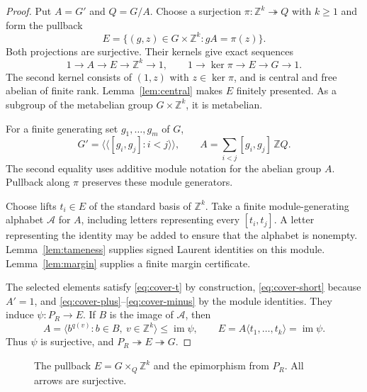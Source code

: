 \documentclass[12pt]{article}
\makeatletter
\renewcommand{\small}{\@setfontsize\small{11}{13.5}}
\numberwithin{equation}{section}
\theoremstyle{definition}
\theoremstyle{remark}
\newcommand{\Z}{\mathbb Z}
\newcommand{\nc}[1]{\langle\!\langle #1\rangle\!\rangle}
\newcommand{\im}{\operatorname{im}}
\newcommand{\epito}{\twoheadrightarrow}
\makeatother
\begin{document}
\begin{proof}
Put $A=G'$ and $Q=G/A$. Choose a surjection
$\pi:\Z^k\epito Q$ with $k\ge1$ and form the pullback
\[
 E=\{(g,z)\in G\times\Z^k:gA=\pi(z)\}.
\]
Both projections are surjective. Their kernels give exact sequences
\begin{equation}
\label{eq:pullback-sequences}
 1\longrightarrow A\longrightarrow E\longrightarrow\Z^k\longrightarrow1,
 \qquad
 1\longrightarrow\ker\pi\longrightarrow E\longrightarrow G\longrightarrow1.
\end{equation}
The second kernel consists of $(1,z)$ with $z\in\ker\pi$, and is
central and free abelian of finite rank. Lemma~\ref{lem:central}
makes $E$ finitely presented. As a subgroup of the metabelian group
$G\times\Z^k$, it is metabelian.

For a finite generating set $g_1,\ldots,g_m$ of $G$,
\[
 G'=\nc{[g_i,g_j]:i<j},\qquad
 A=\sum_{i<j}[g_i,g_j]\,\Z Q.
\]
The second equality uses additive module notation for the abelian
group $A$. Pullback along $\pi$ preserves these module generators.

Choose lifts $t_i\in E$ of the standard basis of $\Z^k$. Take a finite
module-generating alphabet $\mathcal A$ for $A$, including letters
representing every $[t_i,t_j]$. A letter representing the identity
may be added to ensure that the alphabet is nonempty.
Lemma~\ref{lem:tameness} supplies signed Laurent identities on this
module. Lemma~\ref{lem:margin} supplies a finite margin certificate.

The selected elements satisfy \eqref{eq:cover-t} by construction,
\eqref{eq:cover-short} because $A'=1$, and
\eqref{eq:cover-plus}--\eqref{eq:cover-minus} by the module identities.
They induce $\psi:P_R\to E$. If $B$ is the image of $\mathcal A$, then
\[
 A=\langle b^{q(v)}:b\in B,\ v\in\Z^k\rangle
 \le\im\psi,
 \qquad
 E=A\langle t_1,\ldots,t_k\rangle=\im\psi.
\]
Thus $\psi$ is surjective, and $P_R\epito E\epito G$.
\end{proof}

\begin{figure}[tb]
\centering
{}
\caption{The pullback $E=G\times_Q\Z^k$ and the epimorphism from $P_R$.
All arrows are surjective.}
\label{fig:pullback}
\end{figure}
\end{document}
